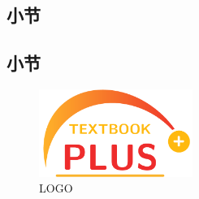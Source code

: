 \documentclass[color=purple,openany]{textbook-cn}
\begin{document}

\begin{multicols}{2}

\begin{QsNum}
\item \lipsum[1][1]
\item \lipsum[1][1]
\item \lipsum[1][1]
\item \lipsum[1][1]
\item \lipsum[1][1]
\item \lipsum[1][1]
\item \lipsum[1][1]
\item \lipsum[1][1]
\item \lipsum[1][1]
\item \lipsum[1][1]
\item \lipsum[1][1]
\item \lipsum[1][1]
\item \lipsum[1][1]
\item \lipsum[1][1]
\item \lipsum[1][1]
\item \lipsum[1][1]
\item \lipsum[1][1]
\item \lipsum[1][1]
\end{QsNum}

\end{multicols}


\clearpage
\subsection{小节}
\subsection*{小节}



\Example{\lipsum[1]}
\Answer{\lipsum[2]}

\begin{figure}[H]
\includegraphics[width=5.0cm]{PLUS.pdf}
\caption{LOGO}
\end{figure}
\end{document}

